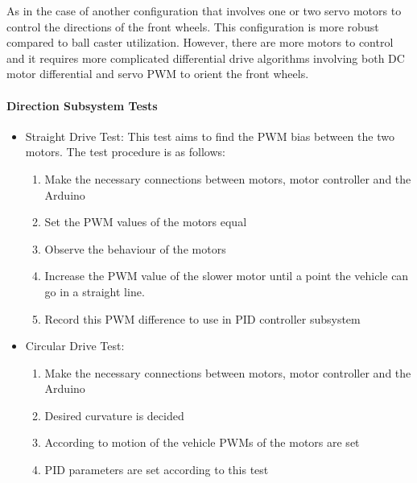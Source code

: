 \documentclass[a4paper,12pt]{article}
\begin{document}
	As in the case of another configuration that involves one or two servo motors to control the directions of the front wheels. This configuration is more robust compared to ball caster utilization. However, there are more motors to control and it requires more complicated differential drive algorithms involving both DC motor differential and servo PWM to orient the front wheels.
	
	\paragraph{Direction Subsystem Tests}
	\begin{itemize}
	
		\item Straight Drive Test:
			This test aims to find the PWM bias between the two motors. The test procedure is as follows:
			\begin{enumerate}
				\item Make the necessary connections between motors, motor controller and the Arduino \vspace{-0.2cm}
				\item Set the PWM values of the motors equal \vspace{-0.2cm}
				\item Observe the behaviour of the motors \vspace{-0.2cm}
				\item Increase the PWM value of the slower motor until a point the vehicle can go in a straight line.
				\item Record this PWM difference to use in PID controller subsystem
			\end{enumerate}
				
		
		\item Circular Drive Test:
			\begin{enumerate}
				\item Make the necessary connections between motors, motor controller and the Arduino \vspace{-0.2cm}
				\item Desired curvature is decided \vspace{-0.2cm}
				\item  According to motion of the vehicle PWMs of the motors are set \vspace{-0.2cm}
				\item  PID parameters are set according to this test
			\end{enumerate}
		
		
	\end{itemize}
	
\end{document}
